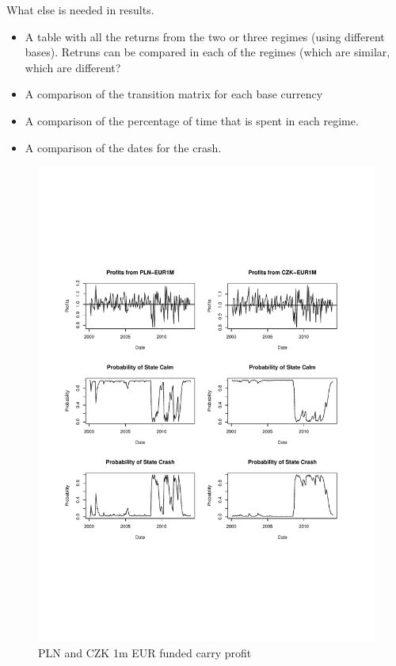 \documentclass[12pt, a4paper, oneside]{article} %
\begin{document}
What else is needed in results.
\begin{itemize}
\item A table with all the returns from the two or three regimes (using different bases).  Retruns can be compared in each of the regimes (which are similar, which are different? 
\item A comparison of the transition matrix for each base currency
\item A comparison of the percentage of time that is spent in each regime. 
\item A comparison of the dates for the crash. 
\end{itemize}
 
  
 
 
 
\begin{figure}[!h]
\centering
\caption{PLN and CZK 1m EUR funded carry profit}
\includegraphics[scale = .75]{../Figures/2RegProb/PLNCZKEUR.pdf}
\end{figure}
\end{document}
